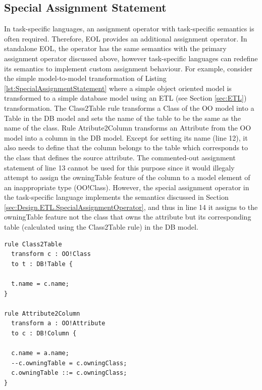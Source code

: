 \subsection{Special Assignment Statement}
\label{sec:Design.EOL.SpecialAssignmentStatement}
In task-specific languages, an assignment operator with task-specific semantics is often required. Therefore, EOL provides an additional assignment operator. In standalone EOL, the operator has the same semantics with the primary assignment operator discussed above, however task-specific languages can redefine its semantics to implement custom
assignment behaviour. For example, consider the simple model-to-model transformation of Listing \ref{lst:SpecialAssignmentStatement} where a simple object oriented model is transformed to a simple database model using an ETL (see Section \ref{sec:ETL}) transformation. The Class2Table rule transforms a Class of the OO model into
a Table in the DB model and sets the name of the table to be the same as the name of the class. Rule Atribute2Column transforms an Attribute from the OO model into a column in the DB model. Except for setting its name (line 12), it also needs to define that the column belongs to the table which corresponds to the class that defines the source attribute. The commented-out assignment statement of line 13 cannot
be used for this purpose since it would illegaly attempt to assign the owningTable feature of the column to a model element of an inappropriate type (OO!Class). However, the special assignment operator in the task-specific language implements the semantics discussed in Section \ref{sec:Design.ETL.SpecialAssignmentOperator}, and thus in line 14 it assigns to the owningTable feature not the class that owns the attribute but its corresponding table (calculated using the Class2Table rule) in the DB model. 

\begin{lstlisting}[basicstyle=\ttfamily\footnotesize, flexiblecolumns=true, numbers=none, nolol=true, caption=A simple model-to-model transformation
demonstrating the special assignment statement, label=lst:SpecialAssignmentStatement, numbers=left, language=ETL, tabsize=2]
rule Class2Table
  transform c : OO!Class
  to t : DB!Table {
  
  t.name = c.name;
}

rule Attribute2Column
  transform a : OO!Attribute
  to c : DB!Column {
  
  c.name = a.name;
  --c.owningTable = c.owningClass;
  c.owningTable ::= c.owningClass;
}

\end{lstlisting}

